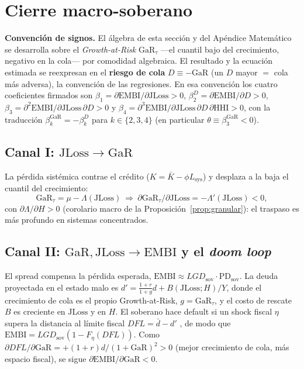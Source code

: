 \documentclass[11pt]{article}
\theoremstyle{plain}
\theoremstyle{definition}
\theoremstyle{remark}
\newcommand{\JLoss}{\mathrm{JLoss}}
\newcommand{\EMBI}{\mathrm{EMBI}}
\newcommand{\GaR}{\mathrm{GaR}}
\newcommand{\PD}{\mathrm{PD}}
\newcommand{\HHI}{\mathrm{HHI}}
\newcommand{\1}{\mathbf{1}}
\begin{document}
\section{Cierre macro-soberano}\label{sec:soberano}

\begin{mdframed}
\noindent\textbf{Convención de signos.} El álgebra de esta sección y del Apéndice
Matemático se desarrolla sobre el \textit{Growth-at-Risk} $\GaR_\tau$ —el cuantil
bajo del crecimiento, negativo en la cola— por comodidad algebraica. El resultado y
la ecuación estimada se reexpresan en el \textbf{riesgo de cola} $D\equiv-\GaR$
(un $D$ mayor $=$ cola más adversa), la convención de las regresiones. En esa
convención los cuatro coeficientes firmados son
$\beta_1=\partial\EMBI/\partial\JLoss>0$,
$\beta_2^{D}=\partial\EMBI/\partial D>0$,
$\beta_3=\partial^2\EMBI/\partial\JLoss\,\partial D>0$ y
$\beta_4=\partial^3\EMBI/\partial\JLoss\,\partial D\,\partial\HHI>0$, con la traducción
$\beta_k^{\GaR}=-\beta_k^{D}$ para $k\in\{2,3,4\}$ (en particular $\theta\equiv\beta_3^{\GaR}<0$).
\end{mdframed}

\subsection{Canal I: $\JLoss\to\GaR$}
La pérdida sistémica contrae el crédito ($K=\bar K-\phi L_{\text{sys}}$) y desplaza a la baja el cuantil del crecimiento:
\begin{equation}
\GaR_\tau=\mu-\Lambda(\JLoss)\ \Longrightarrow\ \partial\GaR_\tau/\partial\JLoss=-\Lambda'(\JLoss)<0,
\label{eq:gar}
\end{equation}
con $\partial\Lambda/\partial H>0$ (corolario macro de la Proposición~\ref{prop:granular}): el traspaso es más profundo en sistemas concentrados.

\subsection{Canal II: $\GaR,\JLoss\to\EMBI$ y el \textit{doom loop}}
El spread compensa la pérdida esperada, $\EMBI\approx LGD_{\text{sov}}\cdot\PD_{\text{sov}}$. La deuda proyectada en el estado malo es $d'=\frac{1+r}{1+g}d+B(\JLoss;H)/Y$, donde el crecimiento de cola es el propio Growth-at-Risk, $g=\GaR_\tau$, y el costo de rescate $B$ es creciente en $\JLoss$ y en $H$. El soberano hace default si un shock fiscal $\eta$ supera la distancia al límite fiscal $DFL=\bar d-d'$ \citep{GhoshEtAl2013}, de modo que $\EMBI=LGD_{\text{sov}}(1-F_\eta(DFL))$. Como $\partial DFL/\partial\GaR=+(1+r)d/(1+\GaR)^2>0$ (mejor crecimiento de cola, más espacio fiscal), se sigue $\partial\EMBI/\partial\GaR<0$.
\end{document}
